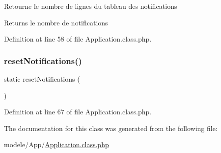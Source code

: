 Retourne le nombre de lignes du tableau des notifications \begin{DoxyReturn}{Returns}
le nombre de notifications 
\end{DoxyReturn}


Definition at line 58 of file Application.\+class.\+php.

\mbox{\label{class_application_a239b8f66e773da322df451ff13cac139}} 
\subsubsection{\texorpdfstring{reset\+Notifications()}{resetNotifications()}}
{\footnotesize\ttfamily static reset\+Notifications (\begin{DoxyParamCaption}{ }\end{DoxyParamCaption})\hspace{0.3cm}{\ttfamily [static]}}



Definition at line 67 of file Application.\+class.\+php.



The documentation for this class was generated from the following file\+:\begin{DoxyCompactItemize}
\item 
modele/\+App/\hyperlink{_application_8class_8php}{Application.\+class.\+php}\end{DoxyCompactItemize}
